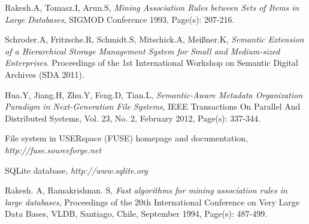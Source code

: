 \begin{thebibliography}{99}
Rakesh.A, Tomasz.I, Arun.S, 
\emph{Mining Association Rules between Sets of Items in Large Databases}, SIGMOD Conference 1993, Page(s): 207-216.

Schroder.A, Fritzsche.R, Schmidt.S, Mitschick.A, Meißner.K, 
\emph{Semantic Extension of a Hierarchical Storage Management System for Small and Medium-sized Enterprises}.
Proceedings of the 1st International Workshop on Semantic Digital Archives (SDA 2011).

Hua.Y, Jiang.H, Zhu.Y, Feng.D, Tian.L,
\emph{Semantic-Aware Metadata Organization Paradigm in Next-Generation File Systems}, 
IEEE Transactions On Parallel And Distributed Systems, 
Vol. 23, No. 2, February 2012, Page(s): 337-344.

File system in USERspace (FUSE) homepage and documentation, 
\emph{http://fuse.sourceforge.net}

SQLite database, 
\emph{http://www.sqlite.org}

Rakesh. A, Ramakrishnan. S, 
\emph{Fast algorithms for mining association rules in large databases},
Proceedings of the 20th International Conference on Very Large Data Bases, VLDB, Santiago, Chile, September 1994, Page(s): 487-499.

\end{thebibliography}
